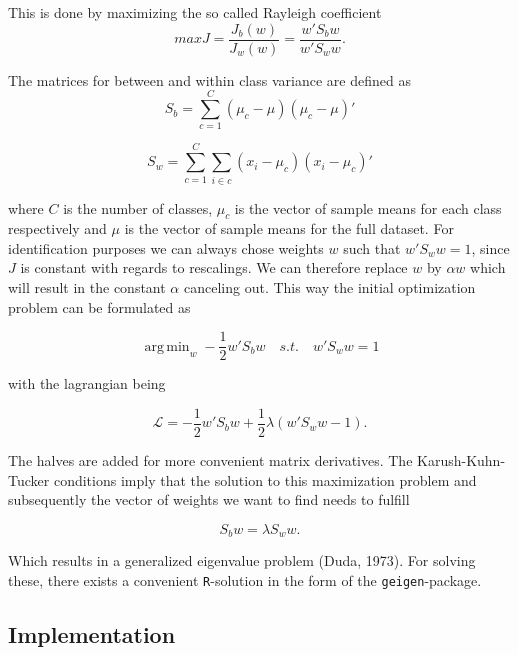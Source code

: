 \documentclass{article}
\DeclareMathOperator*{\argmin}{arg\,min}
\begin{document}
This is done by maximizing the so called Rayleigh coefficient
\begin{equation}
\label{LDA}
max J = \frac{J_b(w)}{J_w(w)} = \frac{w \prime S_{b} w}{w \prime S_{w} w}.
\end{equation}

The matrices for between and within class variance are defined as
\begin{equation}
S_b = \sum_{c=1}^{C}(\mu_c - \mu)(\mu_c - \mu)\prime
\end{equation}

\begin{equation}
\label{Sw}
S_w = \sum_{c=1}^{C}\sum_{i \in c}(x_i - \mu_c)(x_i - \mu_c)\prime
\end{equation} 

where $C$ is the number of classes, $\mu_c$ is the vector of sample means for each class respectively and $\mu$ is the vector of sample means for the full dataset. For identification purposes we can always chose weights $w$ such that $w\prime S_w w = 1$, since $J$ is constant with regards to rescalings. We can therefore replace $w$ by $\alpha w$ which will result in the constant $\alpha$ canceling out. This way the initial optimization problem can be formulated as

\begin{equation}
\argmin_{w} -\frac{1}{2} w\prime S_b w \quad s.t. \quad w \prime S_w w = 1
\end{equation}

with the lagrangian being

\begin{equation}
\mathcal{L} = -\frac{1}{2} w\prime S_b w + \frac{1}{2}\lambda\left(w\prime S_w w - 1\right).
\end{equation}

The halves are added for more convenient matrix derivatives. The Karush-Kuhn-Tucker conditions imply that the solution to this maximization problem and subsequently the vector of weights we want to find needs to fulfill

\begin{equation}
\label{LDAsolution}
S_b w = \lambda S_w w.
\end{equation}

Which results in a generalized eigenvalue problem (Duda, 1973). For solving these, there exists a convenient \texttt{R}-solution in the form of the \texttt{geigen}-package.

\subsection{Implementation}
\end{document}
